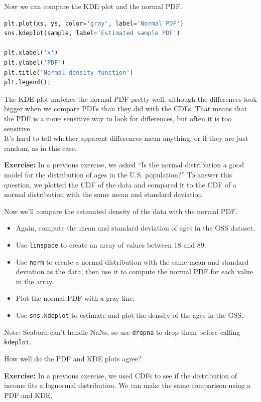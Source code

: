 Now we can compare the KDE plot and the normal PDF.

\begin{lstlisting}[language=Python,style=source]
plt.plot(xs, ys, color='gray', label='Normal PDF')
sns.kdeplot(sample, label='Estimated sample PDF')

plt.xlabel('x')
plt.ylabel('PDF')
plt.title('Normal density function')
plt.legend();
\end{lstlisting}

The KDE plot matches the normal PDF pretty well, although the
differences look bigger when we compare PDFs than they did with the
CDFs. That means that the PDF is a more sensitive way to look for
differences, but often it is too sensitive.\\
It's hard to tell whether apparent differences mean anything, or if they
are just random, as in this case.

\textbf{Exercise:} In a previous exercise, we asked ``Is the normal
distribution a good model for the distribution of ages in the U.S.
population?'' To answer this question, we plotted the CDF of the data
and compared it to the CDF of a normal distribution with the same mean
and standard deviation.

Now we'll compare the estimated density of the data with the normal PDF.

\begin{itemize}
\item
  Again, compute the mean and standard deviation of ages in the GSS
  dataset.
\item
  Use \passthrough{\lstinline!linspace!} to create an array of values
  between 18 and 89.
\item
  Use \passthrough{\lstinline!norm!} to create a normal distribution
  with the same mean and standard deviation as the data, then use it to
  compute the normal PDF for each value in the array.
\item
  Plot the normal PDF with a gray line.
\item
  Use \passthrough{\lstinline!sns.kdeplot!} to estimate and plot the
  density of the ages in the GSS.
\end{itemize}

Note: Seaborn can't handle NaNs, so use \passthrough{\lstinline!dropna!}
to drop them before calling \passthrough{\lstinline!kdeplot!}.

How well do the PDF and KDE plots agree?

\textbf{Exercise:} In a previous exercise, we used CDFs to see if the
distribution of income fits a lognormal distribution. We can make the
same comparison using a PDF and KDE.

